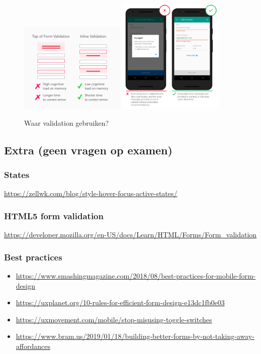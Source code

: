 \documentclass{article}
\begin{document}
\begin{figure}[H]
    \centering
    \includegraphics[width=0.45\textwidth]{validation4.png}
    \includegraphics[width=0.45\textwidth]{validation5.png}
    \caption{Waar validation gebruiken?}
\end{figure}


\subsection{Extra (geen vragen op examen)}
\subsubsection{States}
\url{https://zellwk.com/blog/style-hover-focus-active-states/}


\subsubsection{HTML5 form validation}
\url{https://developer.mozilla.org/en-US/docs/Learn/HTML/Forms/Form_validation}

\subsubsection{Best practices}

\begin{itemize}
    \item \url{https://www.smashingmagazine.com/2018/08/best-practices-for-mobile-form-design}
    \item \url{https://uxplanet.org/10-rules-for-efficient-form-design-e13dc1fb0e03}
    \item \url{https://uxmovement.com/mobile/stop-misusing-toggle-switches}
    \item \url{https://www.bram.us/2019/01/18/building-better-forms-by-not-taking-away-affordances}
\end{itemize}
\end{document}
